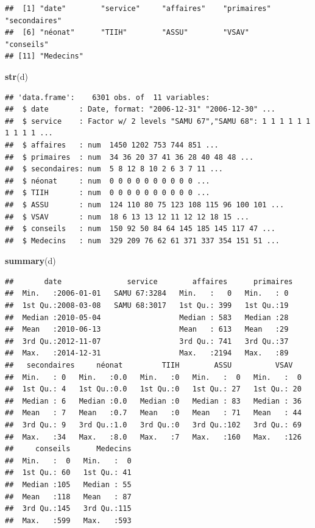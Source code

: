 \documentclass[]{article}
\newenvironment{Shaded}{\begin{snugshade}}{\end{snugshade}}
\newcommand{\KeywordTok}[1]{\textcolor[rgb]{0.13,0.29,0.53}{\textbf{{#1}}}}
\newcommand{\NormalTok}[1]{{#1}}
\begin{document}
\begin{verbatim}
##  [1] "date"        "service"     "affaires"    "primaires"   "secondaires"
##  [6] "néonat"      "TIIH"        "ASSU"        "VSAV"        "conseils"   
## [11] "Medecins"
\end{verbatim}

\begin{Shaded}
\begin{Highlighting}[]
\KeywordTok{str}\NormalTok{(d)}
\end{Highlighting}
\end{Shaded}

\begin{verbatim}
## 'data.frame':    6301 obs. of  11 variables:
##  $ date       : Date, format: "2006-12-31" "2006-12-30" ...
##  $ service    : Factor w/ 2 levels "SAMU 67","SAMU 68": 1 1 1 1 1 1 1 1 1 1 ...
##  $ affaires   : num  1450 1202 753 744 851 ...
##  $ primaires  : num  34 36 20 37 41 36 28 40 48 48 ...
##  $ secondaires: num  5 8 12 8 10 2 6 3 7 11 ...
##  $ néonat     : num  0 0 0 0 0 0 0 0 0 0 ...
##  $ TIIH       : num  0 0 0 0 0 0 0 0 0 0 ...
##  $ ASSU       : num  124 110 80 75 123 108 115 96 100 101 ...
##  $ VSAV       : num  18 6 13 13 12 11 12 12 18 15 ...
##  $ conseils   : num  150 92 50 84 64 145 185 145 117 47 ...
##  $ Medecins   : num  329 209 76 62 61 371 337 354 151 51 ...
\end{verbatim}

\begin{Shaded}
\begin{Highlighting}[]
\KeywordTok{summary}\NormalTok{(d)}
\end{Highlighting}
\end{Shaded}

\begin{verbatim}
##       date               service        affaires      primaires 
##  Min.   :2006-01-01   SAMU 67:3284   Min.   :   0   Min.   : 0  
##  1st Qu.:2008-03-08   SAMU 68:3017   1st Qu.: 399   1st Qu.:19  
##  Median :2010-05-04                  Median : 583   Median :28  
##  Mean   :2010-06-13                  Mean   : 613   Mean   :29  
##  3rd Qu.:2012-11-07                  3rd Qu.: 741   3rd Qu.:37  
##  Max.   :2014-12-31                  Max.   :2194   Max.   :89  
##   secondaires     néonat         TIIH        ASSU          VSAV    
##  Min.   : 0   Min.   :0.0   Min.   :0   Min.   :  0   Min.   :  0  
##  1st Qu.: 4   1st Qu.:0.0   1st Qu.:0   1st Qu.: 27   1st Qu.: 20  
##  Median : 6   Median :0.0   Median :0   Median : 83   Median : 36  
##  Mean   : 7   Mean   :0.7   Mean   :0   Mean   : 71   Mean   : 44  
##  3rd Qu.: 9   3rd Qu.:1.0   3rd Qu.:0   3rd Qu.:102   3rd Qu.: 69  
##  Max.   :34   Max.   :8.0   Max.   :7   Max.   :160   Max.   :126  
##     conseils      Medecins  
##  Min.   :  0   Min.   :  0  
##  1st Qu.: 60   1st Qu.: 41  
##  Median :105   Median : 55  
##  Mean   :118   Mean   : 87  
##  3rd Qu.:145   3rd Qu.:115  
##  Max.   :599   Max.   :593
\end{verbatim}
\end{document}
